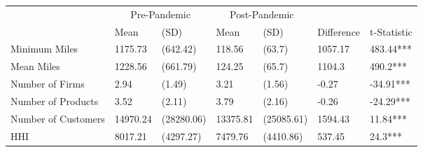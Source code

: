 
\begin{tabular}[t]{lllllll}
\toprule
\multicolumn{1}{c}{ } & \multicolumn{2}{c}{Pre-Pandemic} & \multicolumn{2}{c}{Post-Pandemic} & \multicolumn{2}{c}{ } \\
\cmidrule(l{3pt}r{3pt}){2-3} \cmidrule(l{3pt}r{3pt}){4-5}
 & Mean & (SD) & Mean & (SD) & Difference & t-Statistic\\
\midrule
Minimum Miles & 1175.73 & (642.42) & 118.56 & (63.7) & 1057.17 & 483.44***\\
Mean Miles & 1228.56 & (661.79) & 124.25 & (65.7) & 1104.3 & 490.2***\\
Number of Firms & 2.94 & (1.49) & 3.21 & (1.56) & -0.27 & -34.91***\\
Number of Products & 3.52 & (2.11) & 3.79 & (2.16) & -0.26 & -24.29***\\
Number of Customers & 14970.24 & (28280.06) & 13375.81 & (25085.61) & 1594.43 & 11.84***\\
\addlinespace
HHI & 8017.21 & (4297.27) & 7479.76 & (4410.86) & 537.45 & 24.3***\\
\bottomrule
\end{tabular}
